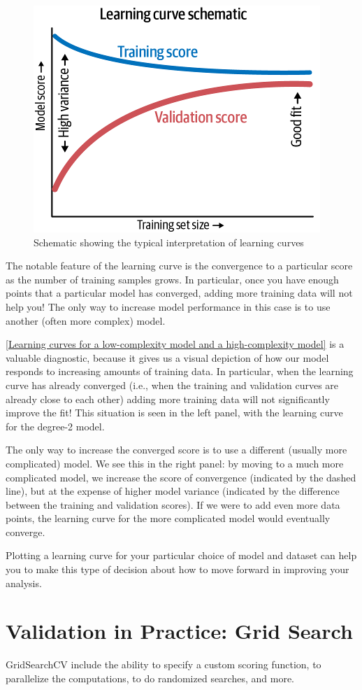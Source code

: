 \begin{figure}
      \centering
      \includegraphics{../img/fig39-11.png}
      \caption{Schematic showing the typical interpretation of learning curves}
      \label{fig39-11}
\end{figure}

The notable feature of the learning curve is the convergence to a particular score as
the number of training samples grows. In particular, once you have enough points
that a particular model has converged, adding more training data will not help you!
The only way to increase model performance in this case is to use another (often
more complex) model.


\autoref{Learning curves for a low-complexity model and a high-complexity model} is a valuable diagnostic, because it gives us a visual depiction of how our model
responds to increasing amounts of training data. In particular, when the learning
curve has already converged (i.e., when the training and validation curves are already
close to each other) adding more training data will not significantly improve the fit!
This situation is seen in the left panel, with the learning curve for the degree-2 model.

The only way to increase the converged score is to use a different (usually more complicated) model. We see this in the right panel: by moving to a much more complicated model, we increase the score of convergence (indicated by the dashed line), but
at the expense of higher model variance (indicated by the difference between the
training and validation scores). If we were to add even more data points, the learning
curve for the more complicated model would eventually converge.

Plotting a learning curve for your particular choice of model and dataset can help you
to make this type of decision about how to move forward in improving your analysis.

\section{Validation in Practice: Grid Search}
GridSearchCV include the ability to specify a custom scoring function, to parallelize the computations, to do randomized searches, and more.